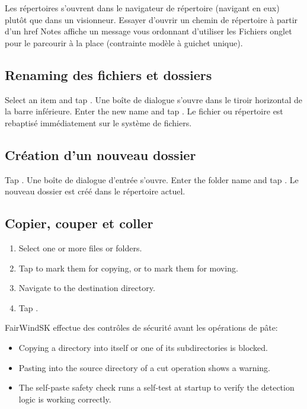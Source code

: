 Les répertoires s'ouvrent dans le navigateur de répertoire (navigant en eux) plutôt que dans un visionneur.
Essayer d'ouvrir un chemin de répertoire à partir d'un href Notes affiche un message vous ordonnant d'utiliser les Fichiers
onglet pour le parcourir à la place (contrainte modèle à guichet unique).


\subsection{Renaming des fichiers et dossiers}

Select an item and tap .
Une boîte de dialogue s'ouvre dans le tiroir horizontal de la barre inférieure.
Enter the new name and tap .
Le fichier ou répertoire est rebaptisé immédiatement sur le système de fichiers.

\subsection{Création d'un nouveau dossier}

Tap .
Une boîte de dialogue d'entrée s'ouvre.
Enter the folder name and tap .
Le nouveau dossier est créé dans le répertoire actuel.

\subsection{Copier, couper et coller}

\begin{enumerate}
  \item Select one or more files or folders.
  \item Tap  to mark them for copying, or  to mark them for moving.
  \item Navigate to the destination directory.
  \item Tap .
\end{enumerate}

FairWindSK effectue des contrôles de sécurité avant les opérations de pâte:

\begin{itemize}
  \item Copying a directory into itself or one of its subdirectories is blocked.
  \item Pasting into the source directory of a cut operation shows a warning.
  \item The self-paste safety check runs a self-test at startup to verify the detection logic is working correctly.
\end{itemize}

